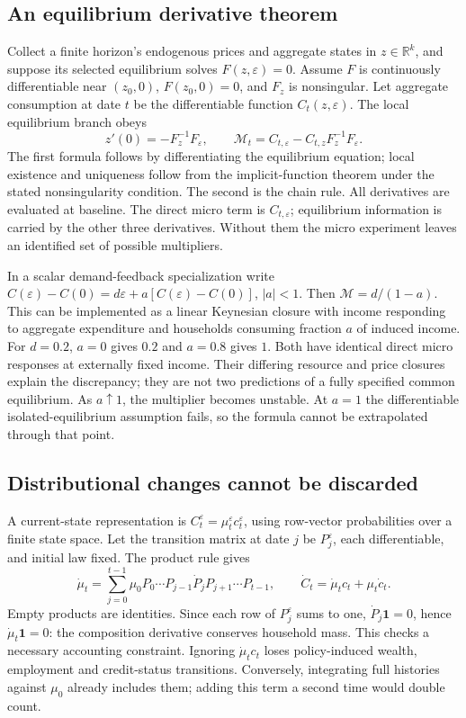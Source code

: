 \documentclass[11pt]{article}
\newcommand{\R}{\mathbb R}
\begin{document}
\subsection*{An equilibrium derivative theorem}
Collect a finite horizon's endogenous prices and aggregate states in
$z\in\R^k$, and suppose its selected equilibrium solves
$F(z,\varepsilon)=0$. Assume $F$ is continuously differentiable near
$(z_0,0)$, $F(z_0,0)=0$, and $F_z$ is nonsingular. Let aggregate
consumption at date $t$ be the differentiable function
$C_t(z,\varepsilon)$. The local equilibrium branch obeys
\[
 z'(0)=-F_z^{-1}F_\varepsilon,\qquad
 \mathcal M_t=C_{t,\varepsilon}-C_{t,z}F_z^{-1}F_\varepsilon.
\]
The first formula follows by differentiating the equilibrium equation;
local existence and uniqueness follow from the implicit-function theorem
under the stated nonsingularity condition. The second is the chain rule.
All derivatives are evaluated at baseline. The direct micro term is
$C_{t,\varepsilon}$; equilibrium information is carried by the other
three derivatives. Without them the micro experiment leaves an identified
set of possible multipliers.

In a scalar demand-feedback specialization write
$C(\varepsilon)-C(0)=d\varepsilon+a[C(\varepsilon)-C(0)]$,
$|a|<1$. Then $\mathcal M=d/(1-a)$. This can be implemented as a
linear Keynesian closure with income responding to aggregate expenditure
and households consuming fraction $a$ of induced income. For $d=0.2$,
$a=0$ gives $0.2$ and $a=0.8$ gives $1$. Both have identical direct
micro responses at externally fixed income. Their differing resource and
price closures explain the discrepancy; they are not two predictions of
a fully specified common equilibrium. As $a\uparrow1$, the multiplier
becomes unstable. At $a=1$ the differentiable isolated-equilibrium
assumption fails, so the formula cannot be extrapolated through that point.

\subsection*{Distributional changes cannot be discarded}
A current-state representation is
$C_t^\varepsilon=\mu_t^\varepsilon c_t^\varepsilon$, using row-vector
probabilities over a finite state space. Let the transition matrix at
date $j$ be $P_j^\varepsilon$, each differentiable, and initial law fixed.
The product rule gives
\[
 \dot\mu_t=\sum_{j=0}^{t-1}
 \mu_0P_0\cdots P_{j-1}\dot P_jP_{j+1}\cdots P_{t-1},
 \qquad
 \dot C_t=\dot\mu_t c_t+\mu_t\dot c_t.
\]
Empty products are identities. Since each row of $P_j^\varepsilon$ sums
to one, $\dot P_j\mathbf1=0$, hence $\dot\mu_t\mathbf1=0$: the
composition derivative conserves household mass. This checks a necessary
accounting constraint. Ignoring $\dot\mu_t c_t$ loses policy-induced
wealth, employment and credit-status transitions. Conversely, integrating
full histories against $\mu_0$ already includes them; adding this term a
second time would double count.
\end{document}
